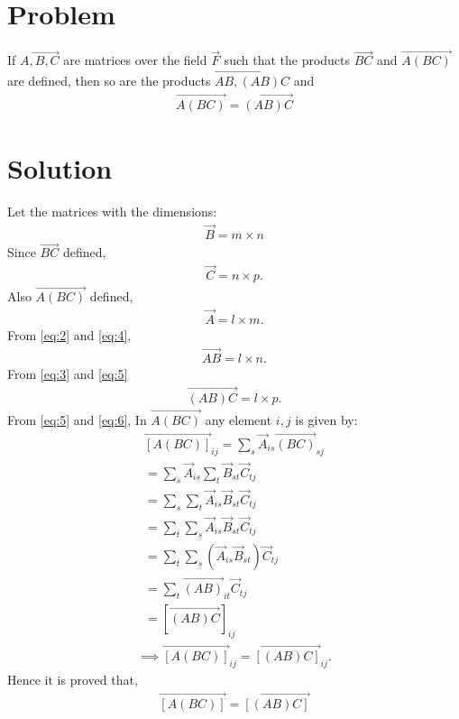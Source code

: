 \documentclass[journal,12pt,twocolumn]{IEEEtran}
\begin{document}
\section{Problem}
If $\vec{A,B,C}$ are matrices over the field $\vec{F}$ such that the products $\vec{BC}$ and $\vec{A(BC)}$ are defined, then so are the products $\vec{AB, (AB)C}$ and 
\begin{align}
   \vec{A(BC)}=\vec{(AB)C} \label{eq:1}
\end{align}
\section{Solution}
Let the matrices with the dimensions:
\begin{align}
\vec{B} =  m \times n \label{eq:2}
\end{align}  
Since $\vec{BC}$ defined,
\begin{align}
   \vec{C}=n \times p. \label{eq:3}
\end{align}
Also $\vec{A(BC)}$ defined,
\begin{align}
    \vec{A}=l \times m. \label{eq:4}
\end{align}
From \eqref{eq:2} and \eqref{eq:4},
\begin{align}
    \vec{AB}=l \times n. \label{eq:5}
\end{align}
From \eqref{eq:3} and \eqref{eq:5}
\begin{align}
    \vec{(AB)C}=l \times p. \label{eq:6}
\end{align}
From \eqref{eq:5} and \eqref{eq:6},
\newpage
In $\vec{A(BC)}$ any element $i,j$ is given by:
\begin{align}
\vec{[A(BC)]}_{ij} =  \sum_s \vec{A}_{is} \vec{(BC)}_{sj}  \\ =\sum_s \vec{A}_{is} \sum_t \vec{B}_{st} \vec{C}_{tj}  \\ = \sum_s \sum_t \vec{A}_{is} \vec{B}_{st} \vec{C}_{tj}\\ = \sum_t \sum_s \vec{A}_{is} \vec{B}_{st}   \vec{C}_{tj} \\ = \sum_t \sum_s (\vec{A}_{is} \vec{B}_{st}) \vec{C}_{tj}\\ = \sum_t \vec{(AB)}_{it} \vec{C}_{tj} \\ = [\vec{(AB)C}]_{ij}
\end{align}
\begin{align}
    \implies \vec{[A(BC)]}_{ij}=\vec{[(AB)C]}_{ij}. \label{eq:7}
\end{align}Hence it is proved that, 
\begin{align}
   \boxed{\vec{[A(BC)]}=\vec{[(AB)C]}} \label{eq:8}
\end{align}
\end{document}
